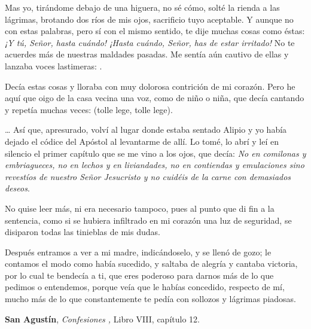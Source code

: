 		\begin{patercite}
			Mas yo, tirándome debajo de una higuera, no sé cómo, solté la rienda a las lágrimas, brotando dos ríos de mis ojos, sacrificio tuyo aceptable. Y aunque no con estas palabras, pero sí con el mismo sentido, te dije muchas cosas como éstas: \emph{¡Y tú, Señor, hasta cuándo! ¡Hasta cuándo, Señor, has de estar irritado!} No te acuerdes más de nuestras maldades pasadas. Me sentía aún cautivo de ellas y lanzaba voces lastimeras: .
			
			Decía estas cosas y lloraba con muy dolorosa contrición de mi corazón. Pero he aquí que oigo de la casa vecina una voz, como de niño o niña, que decía cantando y repetía muchas veces:  (tolle lege, tolle lege).
			
			\ldots{} Así que, apresurado, volví al lugar donde estaba sentado Alipio y yo había dejado el códice del Apóstol al levantarme de allí. Lo tomé, lo abrí y leí en silencio el primer capítulo que se me vino a los ojos, que decía: \emph{No en comilonas y embriagueces, no en lechos y en liviandades, no en contiendas y emulaciones sino revestíos de nuestro Señor Jesucristo y no cuidéis de la carne con demasiados deseos}.
			
			No quise leer más, ni era necesario tampoco, pues al punto que di fin a la sentencia, como si se hubiera infiltrado en mi corazón una luz de seguridad, se disiparon todas las tinieblas de mis dudas.
			
			Después entramos a ver a mi madre, indicándoselo, y se llenó de gozo; le contamos el modo como había sucedido, y saltaba de alegría y cantaba victoria, por lo cual te bendecía a ti, que eres poderoso para darnos más de lo que pedimos o entendemos, porque veía que le habías concedido, respecto de mí, mucho más de lo que constantemente te pedía con sollozos y lágrimas piadosas.
			
			\textbf{San Agustín}, \emph{Confesiones ,} Libro VIII, capítulo 12.
		\end{patercite}